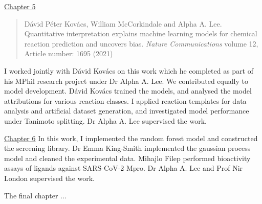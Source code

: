 \hyperref[ch:transformer]{Chapter 5}
\begin{quote}
Dávid Péter Kovács, William McCorkindale and Alpha A. Lee. Quantitative interpretation explains machine learning models for chemical reaction prediction and uncovers bias. \textit{Nature Communications} volume 12, Article number: 1695 (2021)
\end{quote}
I worked jointly with Dávid Kovács on this work which he completed as part of his MPhil research project under Dr Alpha A. Lee. We contributed equally to model development. Dávid Kovács trained the models, and analysed the model attributions for various reaction classes. I applied reaction templates for data analysis and artificial dataset generation, and investigated model performance under Tanimoto splitting.  Dr Alpha A. Lee supervised the work.

\hyperref[ch:testing]{Chapter 6}
In this work, I implemented the random forest model and constructed the screening library. Dr Emma King-Smith implemented the gaussian process model and cleaned the experimental data. Mihajlo Filep performed bioactivity assays of ligands against SARS-CoV-2 Mpro. Dr Alpha A. Lee and Prof Nir London supervised the work.

The final chapter ...